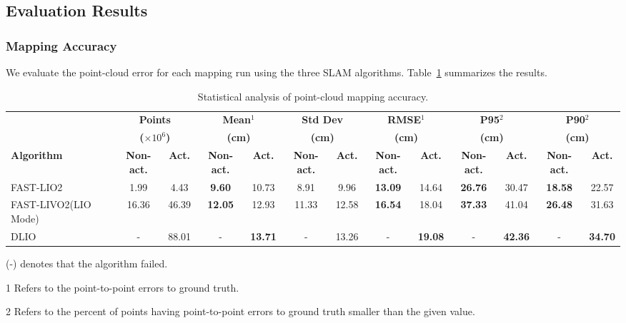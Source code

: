 \documentclass[a4paper, conference]{IEEEtran}
\begin{document}
\subsection{Evaluation Results}\label{AAA}
\subsubsection{Mapping Accuracy}
We evaluate the point-cloud error for each mapping run using the three SLAM algorithms. 
Table~\ref{tab:point_cloud_error} summarizes the results.
\begin{table}
\centering
\begin{threeparttable}
\caption{Statistical analysis of point-cloud mapping accuracy.}
\label{tab:point_cloud_error}
\begin{tabular}{l|cc|cc|cc|cc|cc|cc}
\toprule
& \multicolumn{2}{c|}{\textbf{Points}} & \multicolumn{2}{c|}{\textbf{Mean$^1$}} & \multicolumn{2}{c|}{\textbf{Std Dev}} & \multicolumn{2}{c|}{\textbf{RMSE$^1$}} & \multicolumn{2}{c|}{\textbf{P95$^2$}} & \multicolumn{2}{c}{\textbf{P90$^2$}} \\
& \multicolumn{2}{c|}{\textbf{($\times 10^6$)}} & \multicolumn{2}{c|}{\textbf{(cm)}} & \multicolumn{2}{c|}{\textbf{(cm)}} & \multicolumn{2}{c|}{\textbf{(cm)}} & \multicolumn{2}{c|}{\textbf{(cm)}} & \multicolumn{2}{c}{\textbf{(cm)}} \\
\cmidrule(r){2-3} \cmidrule(lr){4-5} \cmidrule(lr){6-7} \cmidrule(lr){8-9} \cmidrule(l){10-11} \cmidrule(l){12-13}
\textbf{Algorithm} & \textbf{Non-act.} & \textbf{Act.} & \textbf{Non-act.} & \textbf{Act.} & \textbf{Non-act.} & \textbf{Act.} & \textbf{Non-act.} & \textbf{Act.} & \textbf{Non-act.} & \textbf{Act.} & \textbf{Non-act.} & \textbf{Act.} \\
\midrule
FAST-LIO2 & 1.99 & 4.43 & \bf{9.60} & 10.73 & 8.91 & 9.96 & \bf{13.09} & 14.64 & \bf{26.76} & 30.47 & \bf{18.58} & 22.57 \\
FAST-LIVO2(LIO Mode) & 16.36 & 46.39 & \bf{12.05} & 12.93 & 11.33 & 12.58 & \bf{16.54} & 18.04 & \bf{37.33} & 41.04 & \bf{26.48} & 31.63\\
DLIO & - & 88.01 & - & \bf{13.71} & - & 13.26 & - & \bf{19.08} & - & \bf{42.36} & - & \bf{34.70}\\
\bottomrule
\end{tabular}
\begin{tablenotes}
    \item (-) denotes that the algorithm failed.
    \item[1] Refers to the point-to-point errors to ground truth.
    \item[2] Refers to the percent of points having point-to-point errors to ground truth smaller than the given value. 
\end{tablenotes}
\end{threeparttable}
\end{table}
\end{document}
